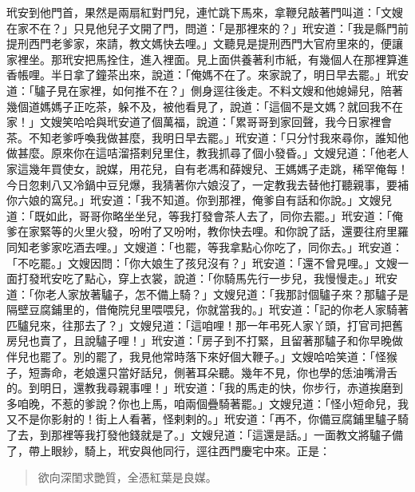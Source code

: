 玳安到他門首，果然是兩扇紅對門兒，連忙跳下馬來，拿鞭兒敲著門叫道：「文嫂在家不在？」只見他兒子文開了門，問道：「是那裡來的？」玳安道：「我是縣門前提刑西門老爹家，來請，教文媽快去哩。」文聽見是提刑西門大官府里來的，便讓家裡坐。那玳安把馬拴住，進入裡面。見上面供養著利市紙，有幾個人在那裡算進香帳哩。半日拿了鐘茶出來，說道：「俺媽不在了。來家說了，明日早去罷。」玳安道：「驢子見在家裡，如何推不在？」側身逕往後走。不料文嫂和他媳婦兒，陪著幾個道媽媽子正吃茶，躲不及，被他看見了，說道：「這個不是文媽？就回我不在家！」文嫂笑哈哈與玳安道了個萬福，說道：「累哥哥到家回聲，我今日家裡會茶。不知老爹呼喚我做甚麼，我明日早去罷。」玳安道：「只分忖我來尋你，誰知他做甚麼。原來你在這咭溜搭剌兒里住，教我抓尋了個小發昏。」文嫂兒道：「他老人家這幾年買使女，說媒，用花兒，自有老馮和薛嫂兒、王媽媽子走跳，稀罕俺每！今日忽剌八又冷鍋中豆兒爆，我猜著你六娘沒了，一定教我去替他打聽親事，要補你六娘的窩兒。」玳安道：「我不知道。你到那裡，俺爹自有話和你說。」文嫂兒道：「既如此，哥哥你略坐坐兒，等我打發會茶人去了，同你去罷。」玳安道：「俺爹在家緊等的火里火發，吩咐了又吩咐，教你快去哩。和你說了話，還要往府里羅同知老爹家吃酒去哩。」文嫂道：「也罷，等我拿點心你吃了，同你去。」玳安道：「不吃罷。」文嫂因問：「你大娘生了孩兒沒有？」玳安道：「還不曾見哩。」文嫂一面打發玳安吃了點心，穿上衣裳，說道：「你騎馬先行一步兒，我慢慢走。」玳安道：「你老人家放著驢子，怎不備上騎？」文嫂兒道：「我那討個驢子來？那驢子是隔壁豆腐鋪里的，借俺院兒里喂喂兒，你就當我的。」玳安道：「記的你老人家騎著匹驢兒來，往那去了？」文嫂兒道：「這咱哩！那一年弔死人家丫頭，打官司把舊房兒也賣了，且說驢子哩！」玳安道：「房子到不打緊，且留著那驢子和你早晚做伴兒也罷了。別的罷了，我見他常時落下來好個大鞭子。」文嫂哈哈笑道：「怪猴子，短壽命，老娘還只當好話兒，側著耳朵聽。幾年不見，你也學的恁油嘴滑舌的。到明日，還教我尋親事哩！」玳安道：「我的馬走的快，你步行，赤道挨磨到多咱晚，不惹的爹說？你也上馬，咱兩個疊騎著罷。」文嫂兒道：「怪小短命兒，我又不是你影射的！街上人看著，怪剌剌的。」玳安道：「再不，你備豆腐鋪里驢子騎了去，到那裡等我打發他錢就是了。」文嫂兒道：「這還是話。」一面教文將驢子備了，帶上眼紗，騎上，玳安與他同行，逕往西門慶宅中來。正是：
\begin{quote}
欲向深閨求艷質，全憑紅葉是良媒。
\end{quote}
